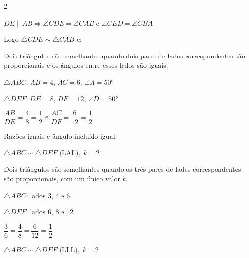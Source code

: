 \documentclass[12pt]{article}
\begin{document}
\begin{multicols}{2}
\begin{center}
\end{center}

$DE \parallel AB \Rightarrow \angle CDE = \angle CAB$ e $\angle CED = \angle CBA$

Logo $\triangle CDE \sim \triangle CAB$ e:



Dois triângulos são semelhantes quando dois pares de lados correspondentes são proporcionais e os ângulos entre esses lados são iguais.


$\triangle ABC$: $AB = 4$, $AC = 6$, $\angle A = 50°$

$\triangle DEF$: $DE = 8$, $DF = 12$, $\angle D = 50°$\vspace{4pt}

$\dfrac{AB}{DE} = \dfrac{4}{8} = \dfrac{1}{2}$ \quad e \quad $\dfrac{AC}{DF} = \dfrac{6}{12} = \dfrac{1}{2}$\vspace{6pt}

Razões iguais e ângulo incluído igual:

$\boxed{\triangle ABC \sim \triangle DEF \text{ (LAL)}, \; k = 2}$


Dois triângulos são semelhantes quando os três pares de lados correspondentes são proporcionais, com um único valor $k$.


$\triangle ABC$: lados $3$, $4$ e $6$

$\triangle DEF$: lados $6$, $8$ e $12$\vspace{4pt}

$\dfrac{3}{6} = \dfrac{4}{8} = \dfrac{6}{12} = \dfrac{1}{2}$\vspace{6pt}

$\boxed{\triangle ABC \sim \triangle DEF \text{ (LLL)}, \; k = 2}$


\end{multicols}
\end{document}
